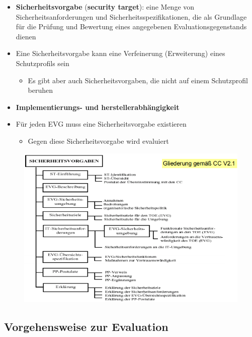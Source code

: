 \documentclass[openany]{book}
\begin{document}
\begin{itemize}
    \item \textbf{Sicherheitsvorgabe} (\textbf{security target}): eine Menge von Sicherheitsanforderungen und Sicherheitsspezifikationen, die als Grundlage für die Prüfung und Bewertung eines angegebenen Evaluationsgegenstands dienen
    \item Eine Sicherheitsvorgabe kann eine Verfeinerung (Erweiterung) eines Schutzprofils sein
    \begin{itemize}
        \item Es gibt aber auch Sicherheitsvorgaben, die nicht auf einem Schutzprofil beruhen
    \end{itemize}
    \item \textbf{Implementierungs- und herstellerabhängigkeit}
    \item Für jeden EVG muss eine Sicherheitsvorgabe existieren
    \begin{itemize}
        \item Gegen diese Sicherheitsvorgabe wird evaluiert
    \end{itemize}
\end{itemize}

\newpage

\begin{figure}[h!]
    \centering
    \includegraphics[width=\linewidth]{Pics/ProtectionProfiles2.PNG}
\end{figure}

\subsection{Vorgehensweise zur Evaluation}
\end{document}
